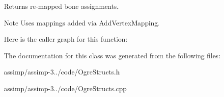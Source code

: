 Returns re-\/mapped bone assignments. 

\begin{DoxyNote}{Note}
Uses mappings added via Add\+Vertex\+Mapping. 
\end{DoxyNote}


Here is the caller graph for this function\+:




The documentation for this class was generated from the following files\+:\begin{DoxyCompactItemize}
\item 
assimp/assimp-\/3../code/Ogre\+Structs.\+h\item 
assimp/assimp-\/3../code/Ogre\+Structs.\+cpp\end{DoxyCompactItemize}
